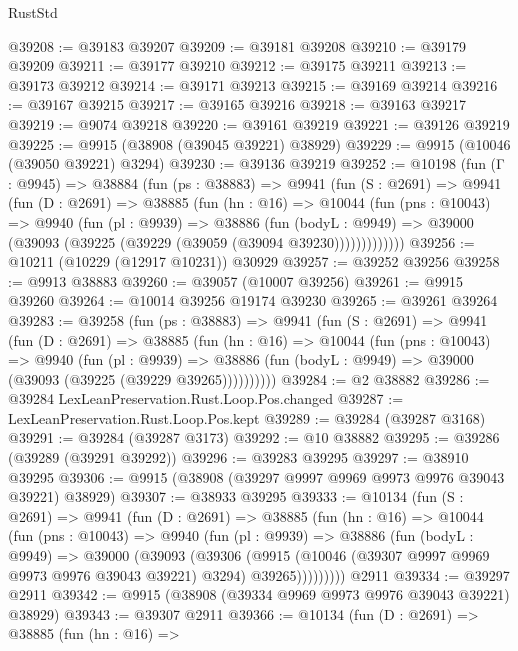 \begin{lexlean}{RustStd}
\begin{coremodule}
@39208 := @39183 @39207
@39209 := @39181 @39208
@39210 := @39179 @39209
@39211 := @39177 @39210
@39212 := @39175 @39211
@39213 := @39173 @39212
@39214 := @39171 @39213
@39215 := @39169 @39214
@39216 := @39167 @39215
@39217 := @39165 @39216
@39218 := @39163 @39217
@39219 := @9074 @39218
@39220 := @39161 @39219
@39221 := @39126 @39219
@39225 := @9915 (@38908 (@39045 @39221) @38929)
@39229 := @9915 (@10046 (@39050 @39221) @3294)
@39230 := @39136 @39219
@39252 := @10198
    (fun (Γ : @9945) =>
    @38884
      (fun (ps : @38883) =>
      @9941
        (fun (S : @2691) =>
        @9941
          (fun (D : @2691) =>
          @38885
            (fun (hn : @16) =>
            @10044
              (fun (pns : @10043) =>
              @9940
                (fun (pl : @9939) =>
                @38886
                  (fun (bodyL : @9949) =>
                  @39000 (@39093 (@39225 (@39229 (@39059 (@39094 @39230)))))))))))))
@39256 := @10211 (@10229 (@12917 @10231)) @30929
@39257 := @39252 @39256
@39258 := @9913 @38883
@39260 := @39057 (@10007 @39256)
@39261 := @9915 @39260
@39264 := @10014 @39256 @19174 @39230
@39265 := @39261 @39264
@39283 := @39258
    (fun (ps : @38883) =>
    @9941
      (fun (S : @2691) =>
      @9941
        (fun (D : @2691) =>
        @38885
          (fun (hn : @16) =>
          @10044
            (fun (pns : @10043) =>
            @9940
              (fun (pl : @9939) =>
              @38886 (fun (bodyL : @9949) => @39000 (@39093 (@39225 (@39229 @39265))))))))))
@39284 := @2 @38882
@39286 := @39284 LexLeanPreservation.Rust.Loop.Pos.changed
@39287 := LexLeanPreservation.Rust.Loop.Pos.kept
@39289 := @39284 (@39287 @3168)
@39291 := @39284 (@39287 @3173)
@39292 := @10 @38882
@39295 := @39286 (@39289 (@39291 @39292))
@39296 := @39283 @39295
@39297 := @38910 @39295
@39306 := @9915 (@38908 (@39297 @9997 @9969 @9973 @9976 @39043 @39221) @38929)
@39307 := @38933 @39295
@39333 := @10134
    (fun (S : @2691) =>
    @9941
      (fun (D : @2691) =>
      @38885
        (fun (hn : @16) =>
        @10044
          (fun (pns : @10043) =>
          @9940
            (fun (pl : @9939) =>
            @38886
              (fun (bodyL : @9949) =>
              @39000
                (@39093
                  (@39306
                    (@9915
                      (@10046 (@39307 @9997 @9969 @9973 @9976 @39043 @39221) @3294)
                      @39265)))))))))
    @2911
@39334 := @39297 @2911
@39342 := @9915 (@38908 (@39334 @9969 @9973 @9976 @39043 @39221) @38929)
@39343 := @39307 @2911
@39366 := @10134
    (fun (D : @2691) =>
    @38885
      (fun (hn : @16) =>

\end{coremodule}
\end{lexlean}
